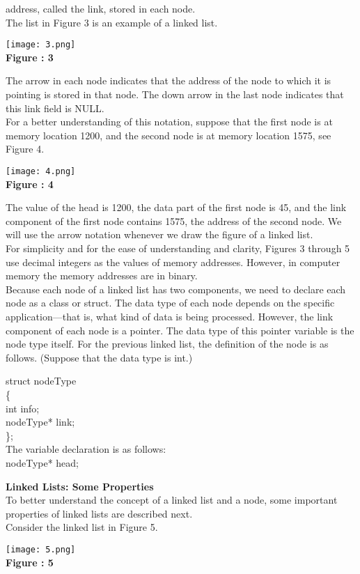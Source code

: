 \documentclass[11pt]{article}            %
\begin{document}
address, called the link, stored in each node.\\
The list in Figure 3 is an example of a linked
list.\\
\begin{center}
 \texttt{[image: 3.png]}\\ 
\textbf{Figure : 3}
\vskip 0.5cm
\end{center}
The arrow in each node indicates that the address of the node to which it is pointing is stored
in that node. The down arrow in the last node indicates that this link field is NULL.\\
For a better understanding of this notation, suppose that the first node is at memory location
1200, and the second node is at memory location 1575, see Figure
4.\\
\begin{center}
 \texttt{[image: 4.png]}\\ 
\textbf{Figure : 4}
\vskip 0.5cm
\end{center}
The value of the head is 1200, the data part of the first node is 45, and the link component of
the first node contains 1575, the address of the second node. We will use the arrow
notation whenever we draw the figure of a linked list.\\
For simplicity and for the ease of understanding and clarity, Figures 3 through 5 use decimal
integers as the values of memory addresses. However, in computer memory the memory
addresses are in binary.\\
Because each node of a linked list has two components, we need to declare each node as a
class or struct. The data type of each node depends on the specific application—that is, what
kind of data is being processed. However, the link component of each node is a pointer. The
data type of this pointer variable is the node type itself. For the previous linked list, the definition
of the node is as follows. (Suppose that the data type is int.)

struct nodeType\\
\{\\ 
int info;\\
nodeType* link;\\
\};\\
The variable declaration is as follows:\\
nodeType* head;

\textbf{Linked Lists: Some Properties }\\
To better understand the concept of a linked list and a node, some important properties of
linked lists are described next. \\
Consider the linked list in Figure 5.
\begin{center}
 \texttt{[image: 5.png]}\\ 
\textbf{Figure : 5}
\vskip 0.5cm
\end{center}
\end{document}
